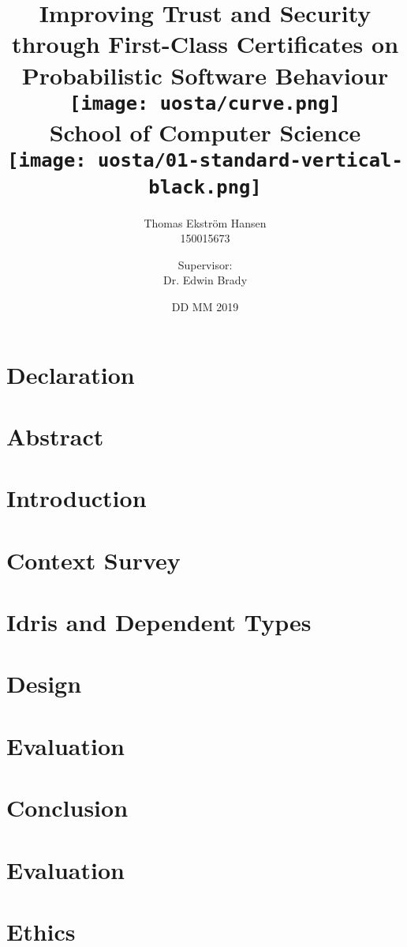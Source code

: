 \documentclass[12pt]{report}
\title{
    {Improving Trust and Security through First-Class Certificates on Probabilistic Software Behaviour}\\
    \vspace{1.5cm}
    {\texttt{[image: uosta/curve.png]}}\\
    {\fontfamily{ppl}\selectfont\large School of Computer Science}\\
    \vspace{-0.8cm}
    {\texttt{[image: uosta/01-standard-vertical-black.png]}}\\
    \vspace{-2cm}
}
\author{
    {Thomas Ekstr{\" o}m Hansen}\\
    {150015673}
    \and
    {Supervisor:}\\
    {Dr. Edwin Brady}
}
\date{DD MM 2019}
\begin{document}
    \maketitle
    
    \chapter*{Declaration}
    
    
    \chapter*{Abstract}
    
    
    \tableofcontents
    
    \chapter{Introduction}
    
    
    \chapter{Context Survey}
    
    
    \chapter{Idris and Dependent Types}\label{ch:idris}
    
        
    \chapter{Design}
    
    
    \chapter{Evaluation}
    
        
    \chapter{Conclusion}
    
    
    
    
    
    \appendix
    
    \chapter{Evaluation}\label{app:evaln}
    
    
    \chapter{Ethics}
    
\end{document}
